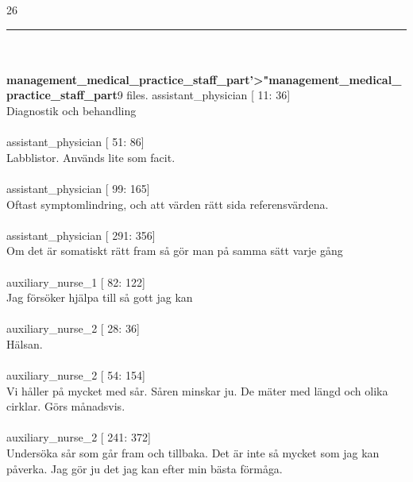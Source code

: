 \documentclass[12pt,a4paper,oneside]{article}
\begin{document}
26 
\hrule
\ \\\ \\{\bf management\_medical\_practice\_staff\_part'>"management\_medical\_practice\_staff\_part}9 files.
 assistant\_physician [  11:  36]\\ 
Diagnostik och behandling %
\ \\\ \\
 assistant\_physician [  51:  86]\\ 
Labblistor. Anv{\"a}nds lite som facit. %
\ \\\ \\
 assistant\_physician [  99: 165]\\ 
Oftast symptomlindring, och att v{\"a}rden r{\"a}tt sida referensv{\"a}rdena.  %
\ \\\ \\
 assistant\_physician [ 291: 356]\\ 
Om det {\"a}r somatiskt r{\"a}tt fram s{\aa} g{\"o}r man p{\aa} samma s{\"a}tt varje g{\aa}ng %
\ \\\ \\
 auxiliary\_nurse\_1 [  82: 122]\\ 
Jag f{\"o}rs{\"o}ker hj{\"a}lpa till s{\aa} gott jag kan %
\ \\\ \\
 auxiliary\_nurse\_2 [  28:  36]\\ 
H{\"a}lsan.  %
\ \\\ \\
 auxiliary\_nurse\_2 [  54: 154]\\ 
Vi h{\aa}ller p{\aa} mycket med s{\aa}r. S{\aa}ren minskar ju. De m{\"a}ter med l{\"a}ngd och olika cirklar. G{\"o}rs m{\aa}nadsvis. %
\ \\\ \\
 auxiliary\_nurse\_2 [ 241: 372]\\ 
Unders{\"o}ka s{\aa}r som g{\aa}r fram och tillbaka. Det {\"a}r inte s{\aa} mycket som jag kan p{\aa}verka. Jag g{\"o}r ju det jag kan efter min b{\"a}sta f{\"o}rm{\aa}ga. %
\ \\\ \\
\end{document}
